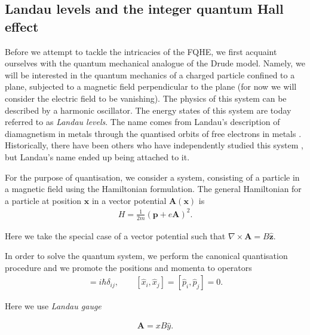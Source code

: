  \subsection{Landau levels and the integer quantum Hall effect}

Before we attempt to tackle the intricacies of the FQHE, we first acquaint ourselves with the quantum mechanical analogue of the Drude model. Namely, we will be interested in the quantum mechanics of a charged particle confined to a plane, subjected to a magnetic field perpendicular to the plane (for now we will consider the electric field to be vanishing). The physics of this system can be described by a harmonic oscillator. The energy states of this system are today referred to as \textit{Landau levels}. The name comes from Landau's description of diamagnetism in metals through the quantised orbits of free electrons in metals \cite{Landau1930}. Historically, there have been others who have independently studied this system \cite{Rabi1928, Fock1928, FrenkelBronshtein1930}, but Landau's name ended up being attached to it.

For the purpose of quantisation, we consider a system, consisting of a particle in a magnetic field using the Hamiltonian formulation. The general Hamiltonian for a particle at position $\bm{x}$ in a vector potential $\bm{A}(\bm{x})$ is 
\begin{align}
    H=\frac{1}{2m}\left(\bm{p} +e \bm{A} \right)^2.
\end{align}

 Here we take the special case of a vector potential such that $\nabla \times \bm{A} = B \hat{\bm{z}}$.

In order to solve the quantum system, we perform the canonical quantisation procedure and we promote the positions and momenta to operators
\begin{align}
    [\hat{x}_i, \hat{p}_j] = i \hbar \delta_{ij}, \qquad [\hat{x}_i, \hat{x}_j]=[\hat{p}_i, \hat{p}_j]=0.
\end{align}

Here we use \textit{Landau gauge}

\begin{align}
    \bm{A}=  x B\hat{y}.
\end{align}

